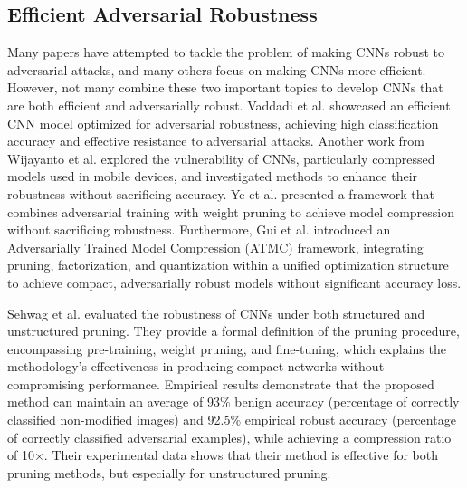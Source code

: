 \documentclass[journal,onecolumn,12pt]{IEEEtran}
\begin{document}
\subsection{Efficient Adversarial Robustness}
Many papers have attempted to tackle the problem of making CNNs robust to adversarial attacks, and many others focus on making CNNs more efficient. However, not many combine these two important topics to develop CNNs that are both efficient and adversarially robust. Vaddadi et al. \cite{EAR1} showcased an efficient CNN model optimized for adversarial robustness, achieving high classification accuracy and effective resistance to adversarial attacks. Another work from Wijayanto et al. \cite{EAR2} explored the vulnerability of CNNs, particularly compressed models used in mobile devices, and investigated methods to enhance their robustness without sacrificing accuracy. Ye et al. \cite{EAR3} presented a framework that combines adversarial training with weight pruning to achieve model compression without sacrificing robustness. Furthermore, Gui et al. \cite{EAR4} introduced an Adversarially Trained Model Compression (ATMC) framework, integrating pruning, factorization, and quantization within a unified optimization structure to achieve compact, adversarially robust models without significant accuracy loss. 

Sehwag et al. \cite{beforehydra} evaluated the robustness of CNNs under both structured and unstructured pruning. They provide a formal definition of the pruning procedure, encompassing pre-training, weight pruning, and fine-tuning, which explains the methodology's effectiveness in producing compact networks without compromising performance. Empirical results demonstrate that the proposed method can maintain an average of 93\% benign accuracy (percentage of correctly classified non-modified images) and 92.5\% empirical robust accuracy (percentage of correctly classified adversarial examples), while achieving a compression ratio of 10×. Their experimental data shows that their method is effective for both pruning methods, but especially for unstructured pruning.
\end{document}
